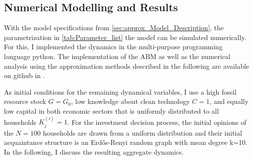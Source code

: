    
\subsection{Numerical Modelling and Results} 
\label{sec:numerical_results}

With the model specifications from \cref{sec:approx_Model_Description}, the parametrization in \cref{tab:Parameter_list} the model can be simulated numerically.
For this, I implemented the dynamics in the multi-purpose programming language python. The implementation of the ABM as well as the numerical analysis using the approximation methods described in the following are available on github in \cite{kolb2018}.

As initial conditions for the remaining dynamical variables, I use a high fossil resource stock $G=G_0$, low knowledge about clean technology $C=1$, and equally low capital in both economic sectors that is uniformly distributed to all households $K_j^{(i)}=1$. For the investment decision process, the initial opinions of the $N=100$ households are drawn from a uniform distribution and their initial acquaintance structure is an Erd\H{o}s-Renyi random graph with mean degree k=10.
In the following, I discuss the resulting aggregate dynamics.



